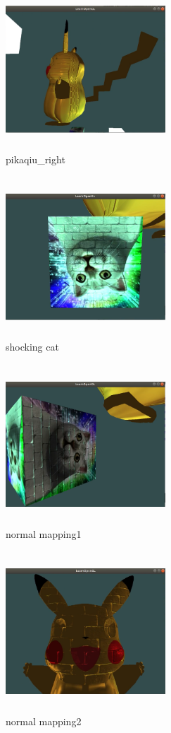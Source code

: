 \documentclass[acmtog]{acmart}
\begin{document}
\begin{figure}[h]
	\centering
	\includegraphics[width=6cm,height=6cm]{3.png}
	\caption{pikaqiu\_right}
\end{figure}

\begin{figure}[h]
	\centering
	\includegraphics[width=6cm,height=6cm]{4.png}
	\caption{shocking cat}
\end{figure}
\begin{figure}[h]
	\centering
	\includegraphics[width=6cm,height=6cm]{6.png}
	\caption{normal mapping1}
\end{figure}
\begin{figure}[h]
	\centering
	\includegraphics[width=6cm,height=6cm]{7.png}
	\caption{normal mapping2}
\end{figure}
\end{document}
